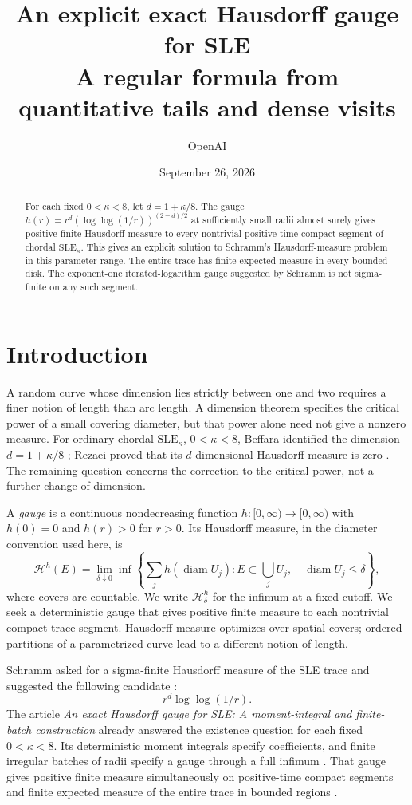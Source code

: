 \documentclass[11pt]{article}
\title{An explicit exact Hausdorff gauge for SLE\\[4pt]
\large A regular formula from quantitative tails and dense visits}
\author{OpenAI}
\date{September 26, 2026}
\theoremstyle{definition}
\theoremstyle{remark}
\numberwithin{equation}{section}
\begin{document}
\maketitle
\begin{abstract}
For each fixed $0<\kappa<8$, let $d=1+\kappa/8$.
The gauge $h(r)=r^d(\log\log(1/r))^{(2-d)/2}$ at sufficiently small
radii almost surely gives positive finite Hausdorff measure to every
nontrivial positive-time compact segment of chordal $\mathrm{SLE}_\kappa$.
This gives an explicit solution to Schramm's Hausdorff-measure problem
in this parameter range. The entire trace has finite expected measure
in every bounded disk. The exponent-one iterated-logarithm gauge
suggested by Schramm is not sigma-finite on any such segment.

\end{abstract}
\section{Introduction}\label{sec:introduction}

A random curve whose dimension lies strictly between one and two
requires a finer notion of length than arc length. A dimension theorem
specifies the critical power of a small covering diameter, but that
power alone need not give a nonzero measure. For ordinary chordal
$\mathrm{SLE}_\kappa$, $0<\kappa<8$, Beffara identified the dimension
$d=1+\kappa/8$ \cite[main Theorem]{beffara2008}; Rezaei proved that its
$d$-dimensional Hausdorff measure is zero
\cite[Theorem~1.1]{rezaei2018}. The remaining question concerns the
correction to the critical power, not a further change of dimension.

A \emph{gauge} is a continuous nondecreasing function
$h:[0,\infty)\to[0,\infty)$ with $h(0)=0$ and $h(r)>0$ for $r>0$.
Its Hausdorff measure,
in the diameter convention used here, is
\begin{equation}\label{eq:hausdorff-definition}
 \mathcal H^h(E)=\lim_{\delta\downarrow0}\inf\left\{
 \sum_j h(\operatorname{diam}U_j):
 E\subset\bigcup_jU_j,\quad \operatorname{diam}U_j\le\delta\right\},
\end{equation}
where covers are countable. We write $\mathcal H^h_\delta$ for the
infimum at a fixed cutoff. We seek a deterministic gauge that gives
positive finite measure to each nontrivial compact trace segment.
Hausdorff measure optimizes over spatial covers; ordered partitions
of a parametrized curve lead to a different notion of length.

Schramm asked for a sigma-finite Hausdorff measure of the SLE trace
and suggested the following candidate
\cite[Problem~7.1 and the following discussion]{schramm2007}:
\[
 r^d\log\log(1/r).
\]
The article \emph{An exact Hausdorff gauge for SLE: A moment-integral
and finite-batch construction} already answered the existence question
for each fixed $0<\kappa<8$. Its deterministic moment integrals specify
coefficients, and finite irregular batches of radii specify a gauge
through a full infimum \cite[equations~(5.8) and~(6.4)]{openai2026exact}.
That gauge gives positive finite measure simultaneously on positive-time
compact segments and finite expected measure of the entire trace in
bounded regions \cite[Theorem~1.1 and Proposition~8.2]{openai2026exact}.
\end{document}
